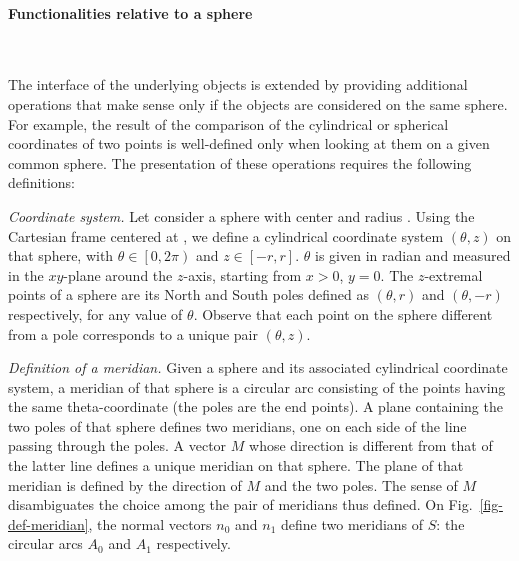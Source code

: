 \paragraph{Functionalities relative to a sphere}~

The interface of the underlying objects is extended by providing
additional operations that make sense only if the objects are
considered on the same sphere. For example, the result of the comparison of the
cylindrical or spherical coordinates of two points is well-defined
only when looking at them on a given common sphere. The presentation
of these operations requires the following definitions:

\textit{Coordinate system.}
Let consider a sphere with center  and radius . Using
the Cartesian frame centered at , we define a cylindrical
coordinate system $(\theta,z)$ on that sphere, with $\theta \in \left[
  0,2\pi \right)$ and $z \in \left[ -r,r \right]$. $\theta$ is given
in radian and measured in the $xy$-plane around the $z$-axis, starting
from $x>0$, $y=0$. The $z$-extremal points of a sphere are its North
and South poles defined as $(\theta,r)$ and $(\theta,-r)$
respectively, for any value of $\theta$. Observe that each point on
the sphere different from a pole corresponds to a unique pair
$(\theta,z)$.

\textit{Definition of a meridian.}
Given a sphere and its associated cylindrical coordinate system, a meridian of that
sphere is a circular arc consisting of the points having the same theta-coordinate
(the poles are the end points).
A plane containing the two poles of that sphere defines two meridians, one on each side
of the line passing through the poles. A vector $M$ whose direction is different from that of the latter
line defines a unique meridian on that sphere. The plane of that meridian is defined by the
direction of $M$ and the two poles. The sense of $M$ disambiguates the choice among the
pair of meridians thus defined.
On Fig.~\ref{fig-def-meridian}, the normal vectors $n_0$ and $n_1$ define 
two meridians of $S$: the circular arcs $A_0$ and $A_1$ respectively.

